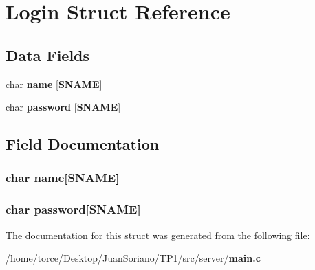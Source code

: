 \section{Login Struct Reference}
\label{struct_login}
\subsection*{Data Fields}
\begin{DoxyCompactItemize}
\item 
char {\bf name} [{\bf S\+N\+A\+ME}]
\item 
char {\bf password} [{\bf S\+N\+A\+ME}]
\end{DoxyCompactItemize}


\subsection{Field Documentation}
\subsubsection[{name}]{\setlength{\rightskip}{0pt plus 5cm}char name[{\bf S\+N\+A\+ME}]}\label{struct_login_a9e46adf32ce202b0f33097479dce0f74}
\subsubsection[{password}]{\setlength{\rightskip}{0pt plus 5cm}char password[{\bf S\+N\+A\+ME}]}\label{struct_login_ac7b9e627171bb0d214aea70b4ca9d5c6}


The documentation for this struct was generated from the following file\+:\begin{DoxyCompactItemize}
\item 
/home/torce/\+Desktop/\+Juan\+Soriano/\+T\+P1/src/server/{\bf main.\+c}\end{DoxyCompactItemize}

